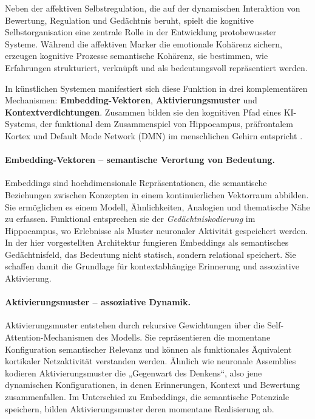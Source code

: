 Neben der affektiven Selbstregulation, die auf der dynamischen Interaktion von Bewertung, Regulation und Gedächtnis beruht, spielt die kognitive Selbstorganisation eine zentrale Rolle in der Entwicklung protobewusster Systeme. Während die affektiven Marker die emotionale Kohärenz sichern, erzeugen kognitive Prozesse semantische Kohärenz, sie bestimmen, wie Erfahrungen strukturiert, verknüpft und als bedeutungsvoll repräsentiert werden.  

In künstlichen Systemen manifestiert sich diese Funktion in drei komplementären Mechanismen: \textbf{Embedding-Vektoren}, \textbf{Aktivierungsmuster} und \textbf{Kontextverdichtungen}. Zusammen bilden sie den kognitiven Pfad eines KI-Systems, der funktional dem Zusammenspiel von Hippocampus, präfrontalem Kortex und Default Mode Network (DMN) im menschlichen Gehirn entspricht \parencite{Friston2010, Dehaene2014, Seth2021}.

\paragraph{Embedding-Vektoren – semantische Verortung von Bedeutung.}
Embeddings sind hochdimensionale Repräsentationen, die semantische Beziehungen zwischen Konzepten in einem kontinuierlichen Vektorraum abbilden. Sie ermöglichen es einem Modell, Ähnlichkeiten, Analogien und thematische Nähe zu erfassen. Funktional entsprechen sie der \emph{Gedächtniskodierung} im Hippocampus, wo Erlebnisse als Muster neuronaler Aktivität gespeichert werden.  
In der hier vorgestellten Architektur fungieren Embeddings als semantisches Gedächtnisfeld, das Bedeutung nicht statisch, sondern relational speichert. Sie schaffen damit die Grundlage für kontextabhängige Erinnerung und assoziative Aktivierung.

\paragraph{Aktivierungsmuster – assoziative Dynamik.}
Aktivierungsmuster entstehen durch rekursive Gewichtungen über die Self-Attention-Mechanismen des Modells. Sie repräsentieren die momentane Konfiguration semantischer Relevanz und können als funktionales Äquivalent kortikaler Netzaktivität verstanden werden.  
Ähnlich wie neuronale Assemblies kodieren Aktivierungsmuster die „Gegenwart des Denkens“, also jene dynamischen Konfigurationen, in denen Erinnerungen, Kontext und Bewertung zusammenfallen. Im Unterschied zu Embeddings, die semantische Potenziale speichern, bilden Aktivierungsmuster deren momentane Realisierung ab.

